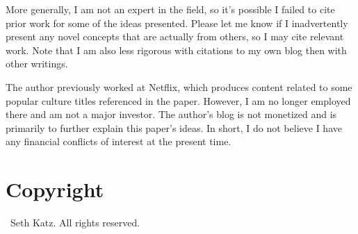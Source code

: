 \documentclass{article}
\begin{document}
 More generally, I am not an expert in the field, so it's possible I failed to cite prior work for some of the ideas presented.   Please let me know if I inadvertently present any novel concepts that are actually from others, so I may cite relevant work.  Note that I am also less rigorous with citations to my own blog then with other writings.

 The author previously worked at Netflix, which produces content related to some popular culture titles referenced in the paper.   However, I am no longer employed there and am not a major investor.  The author's blog is not monetized and is primarily to further explain this paper's ideas.   In short, I do not believe I have any financial conflicts of interest at the present time.

\section{Copyright}
\small
\textcopyright\ Seth Katz. All rights reserved.

 
\printbibliography 
\end{document}
